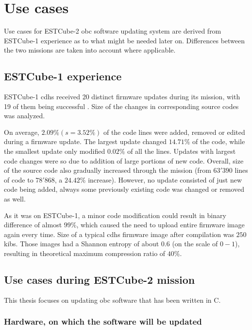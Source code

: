 \newpage
\section{Use cases}

Use cases for ESTCube-2 \gls{obc} software updating system are derived from ESTCube-1 experience as to what might be needed later on. Differences between the two missions are taken into account where applicable.

\subsection{ESTCube-1 experience}

ESTCube-1 \gls{cdhs} received 20 distinct firmware updates during its mission, with 19 of them being successful \cite{Suenter2016}. Size of the changes in corresponding source codes was analyzed.

On average, $2.09\% (s=3.52\%)$ of the code lines were added, removed or edited during a firmware update. The largest update changed $14.71\%$ of the code, while the smallest update only modified $0.02\%$ of all the lines. Updates with largest code changes were so due to addition of large portions of new code. Overall, size of the source code also gradually increased through the mission (from $63'390$ lines of code to $78'868$, a $24.42\%$ increase). However, no update consisted of just new code being added, always some previously existing code was changed or removed as well.

As it was on ESTCube-1, a minor code modification could result in binary difference of almost $99\%$, which caused the need to upload entire firmware image again every time. Size of a typical \gls{cdhs} firmware image after compilation was $250$ \glspl{kib}. Those images had a Shannon entropy of about $0.6$ (on the scale of $0-1$), resulting in theoretical maximum compression ratio of $40\%$. \cite{Suenter2016}

\subsection{Use cases during ESTCube-2 mission}

This thesis focuses on updating \gls{obc} software that has been written in C.

\subsubsection{Hardware, on which the software will be updated}\label{s:hardware}

